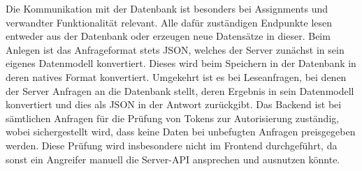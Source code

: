 Die Kommunikation mit der Datenbank ist besonders bei Assignments und verwandter Funktionalität relevant.
Alle dafür zuständigen Endpunkte lesen entweder aus der Datenbank oder erzeugen neue Datensätze in dieser.
Beim Anlegen ist das Anfrageformat stets JSON, welches der Server zunächst in sein eigenes Datenmodell konvertiert.
Dieses wird beim Speichern in der Datenbank in deren natives Format konvertiert.
Umgekehrt ist es bei Leseanfragen, bei denen der Server Anfragen an die Datenbank stellt,
deren Ergebnis in sein Datenmodell konvertiert und dies als JSON in der Antwort zurückgibt.
Das Backend ist bei sämtlichen Anfragen für die Prüfung von Tokens zur Autorisierung zuständig,
wobei sichergestellt wird, dass keine Daten bei unbefugten Anfragen preisgegeben werden.
Diese Prüfung wird insbesondere nicht im Frontend durchgeführt,
da sonst ein Angreifer manuell die Server-API ansprechen und ausnutzen könnte.
